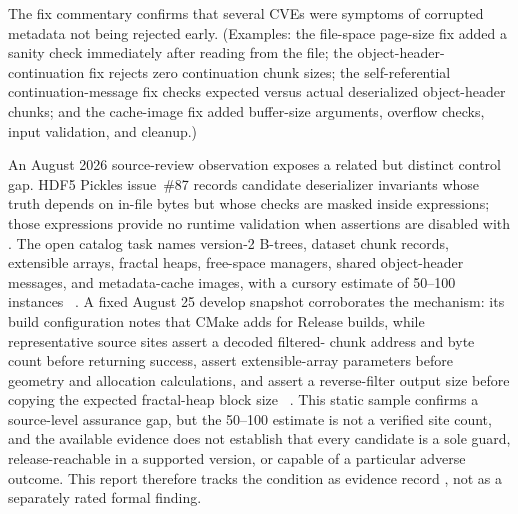 \documentclass[../main.tex]{subfiles}
\begin{document}
The fix commentary confirms that several CVEs were symptoms of corrupted metadata
not being rejected early. (Examples: the file-space page-size fix added a sanity
check immediately after reading  from the file; the
object-header-continuation fix rejects zero continuation chunk sizes;
the self-referential continuation-message fix checks expected versus actual
deserialized object-header chunks; and the cache-image fix added buffer-size
arguments, overflow checks, input validation, and cleanup.)

An August 2026 source-review observation exposes a related but distinct control
gap. HDF5 Pickles issue~\#87 records candidate deserializer invariants whose
truth depends on in-file bytes but whose checks are masked inside
 expressions; those expressions provide no runtime validation
when assertions are disabled with . The open catalog task names
version-2 B-trees, dataset chunk records, extensible arrays, fractal heaps,
free-space managers, shared object-header messages, and metadata-cache images,
with a cursory estimate of 50--100 instances
~\cite{h5lens-issue-87}. A fixed August 25 develop snapshot corroborates
the mechanism: its build configuration notes that CMake adds  for
Release builds, while representative source sites assert a decoded filtered-
chunk address and byte count before returning success, assert extensible-array
parameters before geometry and allocation calculations, and assert a
reverse-filter output size before copying the expected fractal-heap block size
~\cite{hdf5-assert-build-config-2026,hdf5-assert-chunk-record-2026,
hdf5-assert-extensible-array-2026,hdf5-assert-fractal-heap-2026}. This static
sample confirms a source-level assurance gap, but the 50--100 estimate is not a
verified site count, and the available evidence does not establish that every
candidate is a sole guard, release-reachable in a supported version, or capable
of a particular adverse outcome. This report therefore tracks the condition as
evidence record , not as a separately rated formal finding.
\end{document}
